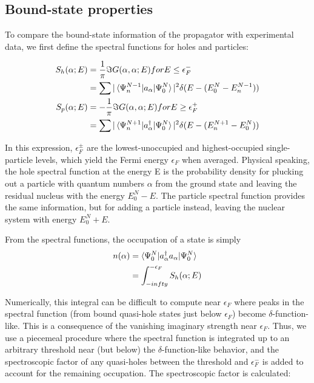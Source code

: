 \subsection{Bound-state properties}
To compare the bound-state information of the propagator with experimental data, we first
define the spectral functions for holes and particles:

\begin{equation}
    \begin{split}
        S_{h}(\alpha; E) & = \frac{1}{\pi}\Im{G(\alpha,\alpha;E)} for E\leq\epsilon_{F}^{-}\\
        & = \sum|\braket{\Psi^{N-1}_{n}|a_{\alpha}|\Psi^{N}_{0}}|^{2}
        \delta(E-(E^{N}_{0}-E_{n}^{N-1}))\\
        S_{p}(\alpha; E) & = -\frac{1}{\pi}\Im{G(\alpha,\alpha;E)}  for E\geq\epsilon_{F}^{+}\\
        & = \sum|\braket{\Psi^{N+1}_{n}|a_{\alpha}^{\dagger}|\Psi^{N}_{0}}|^{2}
        \delta(E-(E_{n}^{N+1}-E^{N}_{0}))
    \end{split}
\end{equation}

\indent
In this expression, $\epsilon_{F}^{\pm}$ are the lowest-unoccupied and highest-occupied
single-particle levels, which yield the Fermi energy $\epsilon_{F}$ when averaged. Physical
speaking, the hole spectral function at the energy E is the probability density for plucking out
a particle with quantum numbers $\alpha$ from the ground state and leaving the residual nucleus with the
energy $E^{N}_{0}-E$. The particle spectral function provides the same information, but for adding a
particle instead, leaving the nuclear system with energy $E^{N}_{0}+E$.

From the spectral functions, the occupation of a state is simply
\begin{equation} \label{ParticleNumber}
    \begin{split}
        n(\alpha) & = \braket{\Psi^{N}_{0}|a_{\alpha}^{\dagger}a_{\alpha}|\Psi^{N}_{0}}\\
        & = \int_{-infty}^{-\epsilon_{F}}S_{h}(\alpha; E)
    \end{split}
\end{equation}

\noindent
Numerically, this integral can be difficult to compute near $\epsilon_{F}$ where peaks in the
spectral function (from bound quasi-hole states just below $\epsilon_{F}$) become $\delta$-function-like. 
This is a consequence of the vanishing imaginary strength near $\epsilon_{F}$. Thus, we use a piecemeal procedure
where the spectral function is integrated up to an arbitrary threshold near (but below) the
$\delta$-function-like behavior, and the spectroscopic factor of any quasi-holes between the threshold and
$\epsilon_{F}^{-}$ is added to account for the remaining occupation. The spectroscopic factor is
calculated:

